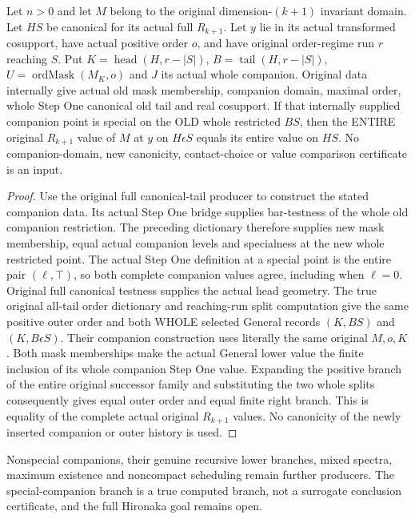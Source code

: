 \begin{theorem}
\label{hir:original-canonical-general-special-companion-value}
\leanok
{}
Let $n>0$ and let $M$ belong to the original dimension-$(k+1)$ invariant
domain. Let $HS$ be canonical for its actual full $R_{k+1}$. Let $y$ lie
in its actual transformed cosupport, have actual positive order $o$, and
have original order-regime run $r$ reaching $S$. Put
$K=\operatorname{head}(H,r-|S|)$, $B=\operatorname{tail}(H,r-|S|)$,
$U=\operatorname{ordMask}(M_K,o)$ and $J$ its actual whole companion.
Original data internally give actual old mask membership, companion domain,
maximal order, whole Step One canonical old tail and real cosupport.
If that internally supplied companion point is special on the OLD whole
restricted $BS$, then the ENTIRE original $R_{k+1}$ value of $M$ at $y$
on $H\epsilon S$ equals its entire value on $HS$. No companion-domain,
new canonicity, contact-choice or value comparison certificate is an input.
\end{theorem}
\begin{proof}
Use the original full canonical-tail producer to construct the stated
companion data. Its actual Step One bridge supplies bar-testness of the
whole old companion restriction. The preceding dictionary therefore supplies
new mask membership, equal actual companion levels and specialness at the
new whole restricted point. The actual Step One definition at a special
point is the entire pair $(\ell,\top)$, so both complete companion values
agree, including when $\ell=0$. Original full canonical testness supplies
the actual head geometry. The true original all-tail order dictionary and
reaching-run split computation give the same positive outer order and
both WHOLE selected General records $(K,BS)$ and $(K,B\epsilon S)$.
Their companion construction uses literally the same original $M,o,K$.
Both mask memberships make the actual General lower value the finite
inclusion of its whole companion Step One value. Expanding the positive
branch of the entire original successor family and substituting the two
whole splits consequently gives equal outer order and equal finite right
branch. This is equality of the complete actual original $R_{k+1}$ values.
No canonicity of the newly inserted companion or outer history is used.
\end{proof}

Nonspecial companions, their genuine recursive lower branches, mixed spectra,
maximum existence and noncompact scheduling remain further producers. The
special-companion branch is a true computed branch, not a surrogate conclusion
certificate, and the full Hironaka goal remains open.
